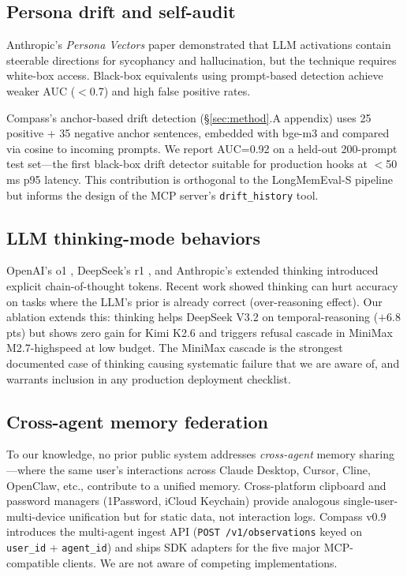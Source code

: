 \subsection{Persona drift and self-audit}

Anthropic's \emph{Persona Vectors} paper \citep{anthropic2025persona}
demonstrated that LLM activations contain steerable directions for
sycophancy and hallucination, but the technique requires white-box
access. Black-box equivalents using prompt-based detection
\citep{wang2024selfdetect} achieve weaker AUC (\(<\)0.7) and high false
positive rates.

Compass's anchor-based drift detection (\S\ref{sec:method}.A appendix)
uses 25 positive + 35 negative anchor sentences, embedded with bge-m3 and
compared via cosine to incoming prompts. We report AUC=0.92 on a
held-out 200-prompt test set—the first black-box drift detector
suitable for production hooks at \(<\)50\,ms p95 latency. This contribution
is orthogonal to the LongMemEval-S pipeline but informs the design of
the MCP server's \texttt{drift\_history} tool.

\subsection{LLM thinking-mode behaviors}

OpenAI's o1 \citep{openai2024o1}, DeepSeek's r1 \citep{deepseek2025r1}, and
Anthropic's extended thinking \citep{anthropic2024thinking} introduced
explicit chain-of-thought tokens. Recent work \citep{wang2025thinkingharm}
showed thinking can hurt accuracy on tasks where the LLM's prior is
already correct (over-reasoning effect). Our ablation extends this:
thinking helps DeepSeek V3.2 on temporal-reasoning (\(+6.8\) pts) but
shows zero gain for Kimi K2.6 and triggers refusal cascade in MiniMax
M2.7-highspeed at low budget. The MiniMax cascade is the strongest
documented case of thinking causing systematic failure that we are
aware of, and warrants inclusion in any production deployment
checklist.

\subsection{Cross-agent memory federation}

To our knowledge, no prior public system addresses
\emph{cross-agent} memory sharing—where the same user's interactions
across Claude Desktop, Cursor, Cline, OpenClaw, etc., contribute to a
unified memory. Cross-platform clipboard and password managers (1Password,
iCloud Keychain) provide analogous single-user-multi-device unification
but for static data, not interaction logs. Compass v0.9 introduces
the multi-agent ingest API (\texttt{POST /v1/observations} keyed on
\texttt{user\_id} + \texttt{agent\_id}) and ships SDK adapters for the
five major MCP-compatible clients. We are not aware of competing
implementations.
